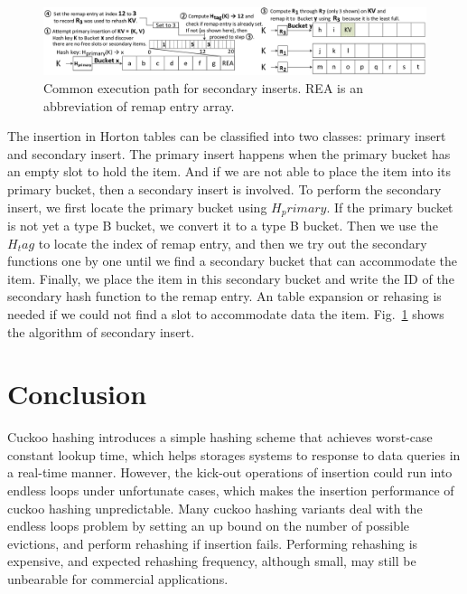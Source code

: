 \documentclass[12pt,conference,compsoc]{IEEEtran}
\begin{document}
\begin{figure}
    \centering
    \includegraphics[width=\textwidth]{Horton-insert.png}
    \caption{Common execution path for secondary inserts. REA is an abbreviation of remap entry array.} \label{fig:Horton-insert}
\end{figure}

The insertion in Horton tables can be classified into two classes: primary insert and secondary insert. The primary insert happens when the primary bucket has an empty slot to hold the item. And if we are not able to place the item into its primary bucket, then a secondary insert is involved. To perform the secondary insert, we first locate the primary bucket using $H_primary$. If the primary bucket is not yet a type B bucket, we convert it to a type B bucket. Then we use the $H_tag$ to locate the index of remap entry, and then we try out the secondary functions one by one until we find a secondary bucket that can accommodate the item. Finally, we place the item in this secondary bucket and write the ID of the secondary hash function to the remap entry. An table expansion or rehasing is needed if we could not find a slot to accommodate data the item. Fig.~\ref{fig:Horton-insert} shows the algorithm of secondary insert.

\section{Conclusion}
\label{sec:conclude}
Cuckoo hashing introduces a simple hashing scheme that achieves worst-case constant lookup time, which helps storages systems to response to data queries in a real-time manner. However, the kick-out operations of insertion could run into endless loops under unfortunate cases, which makes the insertion performance of cuckoo hashing unpredictable. Many cuckoo hashing variants deal with the endless loops problem by setting an up bound on the number of possible evictions, and perform rehashing if insertion fails. Performing rehashing is expensive, and expected rehashing frequency, although small, may still be unbearable for commercial applications. 
\end{document}

